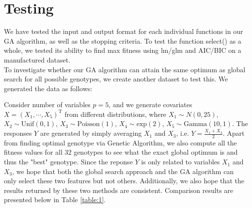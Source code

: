 \documentclass{article}
\def\T{{ \mathrm{\scriptscriptstyle T} }}
\def\T{\mathrm{\scriptstyle T}} %
\begin{document}

\section{Testing}\label{s2}
We have tested the input and output format for each individual functions in our GA algorithm, as well as the stopping criteria. To test the function select() as a whole, we tested its ability to find max fitness using lm/glm and AIC/BIC on a manufactured dataset.\\

\noindent
To investigate whether our GA algorithm can attain the same optimum as global search for all possible genotypes, we create another dataset to test this. We generated the data as follows:

\vspace{3mm}
\noindent
Consider number of variables $p=5$, and we generate covariates $X=(X_{1}, \cdots, X_{5})^{\T}$ from different distributions, where $X_{1}\sim N(0,25)$, $X_{2}\sim \mathrm{Unif}(0,1)$, $X_{3}\sim \mathrm{Poisson}(1)$, $X_{4}\sim \mathrm{exp}(2)$, $X_{5}\sim \mathrm{Gamma}(10,1)$. The responses $Y$ are generated by simply averaging $X_{1}$ and $X_{3}$, i.e. $Y=\frac{X_{1}+X_{3}}{2}$. Apart from finding optimal genotype via Genetic Algorithm, we also compute all the fitness values for all 32 genotypes to see what the exact global optimum is and thus the "best" genotype. Since the reponse $Y$ is only related to variables $X_{1}$ and $X_{3}$, we hope that both the global search approach and the GA algorithm can only select these two features but not others. Additionally, we also hope that the results returned by these two methods are consistent. Comparison results are presented below in Table \ref{table:1}.
\end{document}
